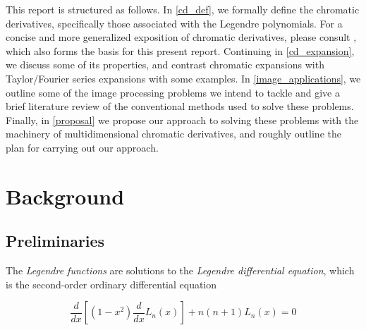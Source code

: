 \documentclass[11pt,oneside]{book}
\theoremstyle{plain}
\theoremstyle{definition}
\theoremstyle{remark}
\begin{document}
This report is structured as follows. In \cref{cd_def}, we formally define the chromatic 
derivatives, specifically those associated with the Legendre polynomials. For a concise and more 
generalized exposition of chromatic derivatives, please consult \cite{Ignjatovic2009}, which also 
forms the basis for this present report. Continuing in \cref{cd_expansion}, we discuss some of its 
properties, and contrast chromatic expansions with Taylor/Fourier series expansions with some 
examples. In \cref{image_applications}, we outline some of the image processing problems we intend 
to tackle and give a brief literature review of the conventional methods used to solve these problems. 
Finally, in \cref{proposal} we propose our approach to solving these problems with the machinery of 
multidimensional chromatic derivatives, and roughly outline the plan for carrying out our approach.

\newpage

\chapter{Background}

\section{Preliminaries}

The \emph{Legendre functions} are solutions to the \emph{Legendre differential 
equation}, which is the second-order ordinary differential equation

\begin{equation} \label{eq:legendre_de}
\frac{d}{dx}\left[(1-x^2)\frac{d}{dx}L_n(x)\right]+n(n+1)L_n(x)=0
\end{equation}
\end{document}
